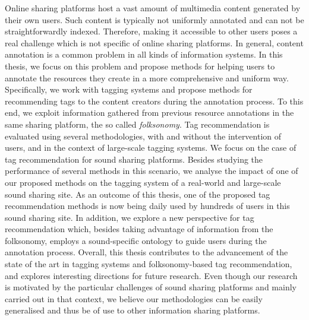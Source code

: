 Online sharing platforms host a vast amount of multimedia content generated by their own users. 
Such content is typically not uniformly annotated and can not be straightforwardly indexed. Therefore, making it accessible to other users poses a real challenge which is not specific of online sharing platforms. In general, content annotation is a common problem in all kinds of information systems.
In this thesis, we focus on this problem and propose methods for helping users to annotate the resources they create in a more comprehensive and uniform way. Specifically, we work with tagging systems and propose methods for recommending tags to the content creators during the annotation process.
To this end, we exploit information gathered from previous resource annotations in the same sharing platform, the so called \emph{folksonomy}.
Tag recommendation is evaluated using several methodologies, with and without the intervention of users, and in the context of large-scale tagging systems. 
We focus on the case of tag recommendation for sound sharing platforms. Besides studying the performance of several methods in this scenario, we analyse the impact of one of our proposed methods on the tagging system of a real-world and large-scale sound sharing site.
As an outcome of this thesis, one of the proposed tag recommendation methods is now being daily used by hundreds of users in this sound sharing site.
In addition, we explore a new perspective for tag recommendation which, besides taking advantage of information from the folksonomy, employs a sound-specific ontology to guide users during the annotation process.
Overall, this thesis contributes to the advancement of the state of the art in tagging systems and folksonomy-based tag recommendation, and explores interesting directions for future research. 
Even though our research is motivated by the particular challenges of sound sharing platforms and mainly carried out in that context, we believe our methodologies can be easily generalised and thus be of use to other information sharing platforms.